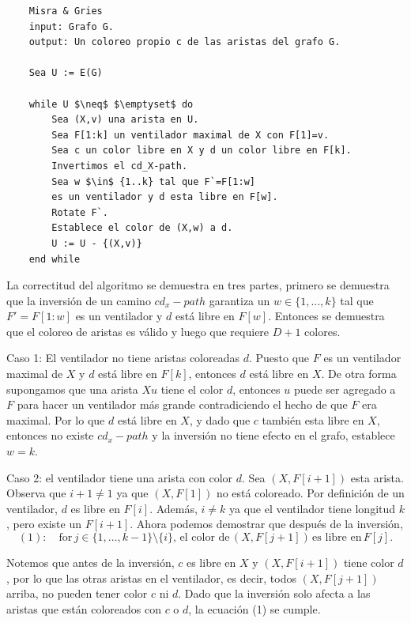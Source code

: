 \documentclass[a4paper]{article}
\begin{document}
\begin{lstlisting}
    Misra & Gries 
    input: Grafo G.
    output: Un coloreo propio c de las aristas del grafo G.

    Sea U := E(G)

    while U $\neq$ $\emptyset$ do
        Sea (X,v) una arista en U.  
        Sea F[1:k] un ventilador maximal de X con F[1]=v.
        Sea c un color libre en X y d un color libre en F[k].  
        Invertimos el cd_X-path.  
        Sea w $\in$ {1..k} tal que F`=F[1:w]
        es un ventilador y d esta libre en F[w].  
        Rotate F`.
        Establece el color de (X,w) a d.
        U := U - {(X,v)}
    end while
\end{lstlisting}

La correctitud del algoritmo se demuestra en tres partes, primero se demuestra que la inversi\'on de un camino $cd_x-path$ garantiza un $w \in \{1,...,k\}$ tal que $F' = F[1:w]$ es un ventilador y $d$ est\'a libre en $F[w]$. Entonces se demuestra que el coloreo de aristas es v\'alido y luego que requiere $D+1$ colores.

Caso 1: El ventilador no tiene aristas coloreadas $d$. Puesto que $F$ es un ventilador maximal de $X$ y $d$ est\'a libre en $F[k]$, entonces $d$ est\'a libre en $X$. De otra forma supongamos que una arista $Xu$ tiene el color $d$, entonces $u$ puede ser agregado a $F$ para hacer un ventilador m\'as grande contradiciendo el hecho de que $F$ era maximal. Por lo que $d$ est\'a libre en $X$, y dado que $c$ tambi\'en esta libre en $X$, entonces no existe $cd_x-path$ y la inversi\'on no tiene efecto en el grafo, establece $w = k$.

Caso 2: el ventilador tiene una arista con color \( d \). Sea \( (X, F[i+1]) \) esta arista. Observa que \( i+1 \neq 1 \) ya que \( (X, F[1]) \) no está coloreado. Por definición de un ventilador, \( d \) es libre en \( F[i] \). Además, \( i \neq k \) ya que el ventilador tiene longitud \( k \), pero existe un \( F[i+1] \). Ahora podemos demostrar que después de la inversión,
\[
(1): \quad \text{for} \, j \in \{1, \dots, k-1\} \setminus \{i\}, \, \text{el color de} \, (X, F[j+1]) \, \text{es libre en} \, F[j].
\]


Notemos que antes de la inversión, \( c \) es libre en \( X \) y \( (X, F[i+1]) \) tiene color \( d \), por lo que las otras aristas en el ventilador, es decir, todos \( (X, F[j+1]) \) arriba, no pueden tener color \( c \) ni \( d \). Dado que la inversión solo afecta a las aristas que están coloreados con \( c \) o \( d \), la ecuación (1) se cumple.
\end{document}
